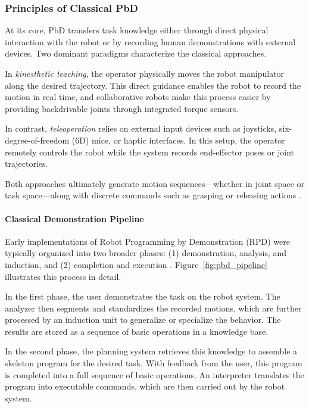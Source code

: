 \subsubsection{Principles of Classical PbD}

At its core, PbD transfers task knowledge either through direct physical interaction with the robot or by recording human demonstrations with external devices. Two dominant paradigms characterize the classical approaches.  

In \emph{kinesthetic teaching}, the operator physically moves the robot manipulator along the desired trajectory. This direct guidance enables the robot to record the motion in real time, and collaborative robots make this process easier by providing backdrivable joints through integrated torque sensors.  

In contrast, \emph{teleoperation} relies on external input devices such as joysticks, six-degree-of-freedom (6D) mice, or haptic interfaces. In this setup, the operator remotely controls the robot while the system records end-effector poses or joint trajectories.  

Both approaches ultimately generate motion sequences—whether in joint space or task space—along with discrete commands such as grasping or releasing actions \cite{friedrich1996robot}.  

\paragraph{Classical Demonstration Pipeline} Early implementations of Robot Programming by Demonstration (RPD) were typically organized into two broader phases: (1) demonstration, analysis, and induction, and (2) completion and execution \cite{friedrich1996robot}. Figure~\ref{fig:pbd_pipeline} illustrates this process in detail.  

In the first phase, the user demonstrates the task on the robot system. The analyzer then segments and standardizes the recorded motions, which are further processed by an induction unit to generalize or specialize the behavior. The results are stored as a sequence of basic operations in a knowledge base.  

In the second phase, the planning system retrieves this knowledge to assemble a skeleton program for the desired task. With feedback from the user, this program is completed into a full sequence of basic operations. An interpreter translates the program into executable commands, which are then carried out by the robot system.  

